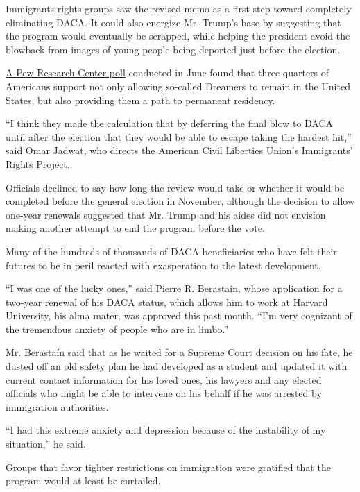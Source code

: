 Immigrants rights groups saw the revised memo as a first step toward
completely eliminating DACA. It could also energize Mr. Trump's base by
suggesting that the program would eventually be scrapped, while helping
the president avoid the blowback from images of young people being
deported just before the election.

\href{https://www.pewresearch.org/fact-tank/2020/06/17/americans-broadly-support-legal-status-for-immigrants-brought-to-the-u-s-illegally-as-children/}{A
Pew Research Center poll} conducted in June found that three-quarters of
Americans support not only allowing so-called Dreamers to remain in the
United States, but also providing them a path to permanent residency.

``I think they made the calculation that by deferring the final blow to
DACA until after the election that they would be able to escape taking
the hardest hit,'' said Omar Jadwat, who directs the American Civil
Liberties Union's Immigrants' Rights Project.

Officials declined to say how long the review would take or whether it
would be completed before the general election in November, although the
decision to allow one-year renewals suggested that Mr. Trump and his
aides did not envision making another attempt to end the program before
the vote.

Many of the hundreds of thousands of DACA beneficiaries who have felt
their futures to be in peril reacted with exasperation to the latest
development.

``I was one of the lucky ones,'' said Pierre R. Berastaín, whose
application for a two-year renewal of his DACA status, which allows him
to work at Harvard University, his alma mater, was approved this past
month. ``I'm very cognizant of the tremendous anxiety of people who are
in limbo.''

Mr. Berastaín said that as he waited for a Supreme Court decision on his
fate, he dusted off an old safety plan he had developed as a student and
updated it with current contact information for his loved ones, his
lawyers and any elected officials who might be able to intervene on his
behalf if he was arrested by immigration authorities.

``I had this extreme anxiety and depression because of the instability
of my situation,'' he said.

Groups that favor tighter restrictions on immigration were gratified
that the program would at least be curtailed.

